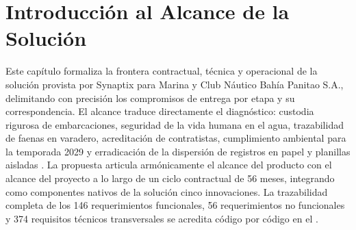 \chapter{Introducción al Alcance de la Solución}

Este capítulo formaliza la frontera contractual, técnica y operacional de la solución provista por Synaptix para Marina y Club Náutico Bahía Panitao S.A., delimitando con precisión los compromisos de entrega por etapa y su correspondencia. El alcance traduce directamente el diagnóstico: custodia rigurosa de embarcaciones, seguridad de la vida humana en el agua, trazabilidad de faenas en varadero, acreditación de contratistas, cumplimiento ambiental para la temporada 2029 y erradicación de la dispersión de registros en papel y planillas aisladas \parencite[caps.~3, 7 y 10]{caso07}. 
La propuesta articula armónicamente el alcance del producto con el alcance del proyecto a lo largo de un ciclo contractual de 56 meses, integrando como componentes nativos de la solución cinco innovaciones. La trazabilidad completa de los 146 requerimientos funcionales, 56 requerimientos no funcionales y 374 requisitos técnicos transversales se acredita código por código en el .

\newpage

